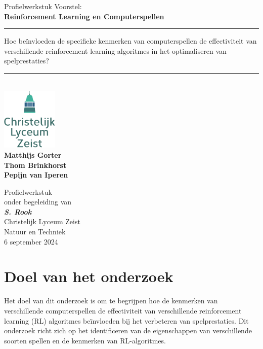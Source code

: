 \documentclass[a4paper,12pt]{article}
\title{}
\author{}
\date{}
\begin{document}
\begin{titlepage}
    \centering
    \vspace*{0cm}
    \LARGE{Profielwerkstuk Voorstel:} \\
    \Huge\textbf{Reinforcement Learning en Computerspellen} \\
    \vspace{1.5cm}
    \rule{\linewidth}{0.4mm}
    \Large
    Hoe beïnvloeden de specifieke kenmerken van computerspellen de effectiviteit van verschillende reinforcement learning-algoritmes in het optimaliseren van spelprestaties? \\
    \rule{\linewidth}{0.4mm} \\
    \vspace{1.5cm}
    \includegraphics[width=0.2\textwidth]{../assets/logo-clz.png} \\ 
    \vspace{\fill}
    \large
    \textbf{Matthijs Gorter} \\
    \textbf{Thom Brinkhorst} \\
    \textbf{Pepijn van Iperen} \\
    \vspace{\fill}
    \normalsize

    Profielwerkstuk \\ onder begeleiding van \\ \textit{\textbf{S. Rook}} \\
    Christelijk Lyceum Zeist \\ Natuur en Techniek \\ 6 september 2024 \\ \newpage
\end{titlepage}
\section{Doel van het onderzoek}
Het doel van dit onderzoek is om te begrijpen hoe de kenmerken van
verschillende computerspellen de effectiviteit van verschillende reinforcement
learning (RL) algoritmes beïnvloeden bij het verbeteren van spelprestaties. Dit
onderzoek richt zich op het identificeren van de eigenschappen van
verschillende soorten spellen en de kenmerken van RL-algoritmes.
\end{document}
